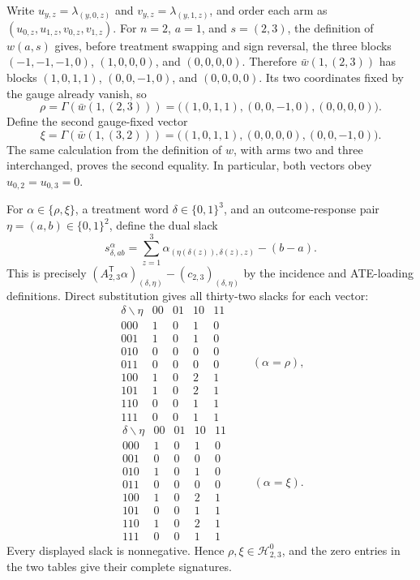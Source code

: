 Write \(u_{y,z}=\lambda_{(y,0,z)}\) and \(v_{y,z}=\lambda_{(y,1,z)}\), and order each arm as \((u_{0,z},u_{1,z},v_{0,z},v_{1,z})\). For \(n=2\), \(a=1\), and \(s=(2,3)\), the definition of \(w(a,s)\) gives, before treatment swapping and sign reversal, the three blocks \((-1,-1,-1,0)\), \((1,0,0,0)\), and \((0,0,0,0)\). Therefore \(\bar w(1,(2,3))\) has blocks \((1,0,1,1)\), \((0,0,-1,0)\), and \((0,0,0,0)\). Its two coordinates fixed by the gauge already vanish, so
\[
\rho=\Gamma(\bar w(1,(2,3)))=\bigl((1,0,1,1),(0,0,-1,0),(0,0,0,0)\bigr).
\]
Define the second gauge-fixed vector
\[
\xi=\Gamma(\bar w(1,(3,2)))=\bigl((1,0,1,1),(0,0,0,0),(0,0,-1,0)\bigr).
\]
The same calculation from the definition of \(w\), with arms two and three interchanged, proves the second equality. In particular, both vectors obey \(u_{0,2}=u_{0,3}=0\).

For \(\alpha\in\{\rho,\xi\}\), a treatment word \(\delta\in\{0,1\}^3\), and an outcome-response pair \(\eta=(a,b)\in\{0,1\}^2\), define the dual slack
\[
s^{\alpha}_{\delta,ab}=\sum_{z=1}^3\alpha_{(\eta(\delta(z)),\delta(z),z)}-(b-a).
\]
This is precisely \((A_{2,3}^{\mathsf T}\alpha)_{(\delta,\eta)}-(c_{2,3})_{(\delta,\eta)}\) by the incidence and ATE-loading definitions. Direct substitution gives all thirty-two slacks for each vector:
\[
\begin{array}{c|rrrr}
\delta\backslash\eta&00&01&10&11\\ \hline
000&1&0&1&0\\
001&1&0&1&0\\
010&0&0&0&0\\
011&0&0&0&0\\
100&1&0&2&1\\
101&1&0&2&1\\
110&0&0&1&1\\
111&0&0&1&1
\end{array}
\qquad(\alpha=\rho),
\]
\[
\begin{array}{c|rrrr}
\delta\backslash\eta&00&01&10&11\\ \hline
000&1&0&1&0\\
001&0&0&0&0\\
010&1&0&1&0\\
011&0&0&0&0\\
100&1&0&2&1\\
101&0&0&1&1\\
110&1&0&2&1\\
111&0&0&1&1
\end{array}
\qquad(\alpha=\xi).
\]
Every displayed slack is nonnegative. Hence \(\rho,\xi\in\mathcal H^0_{2,3}\), and the zero entries in the two tables give their complete signatures.


